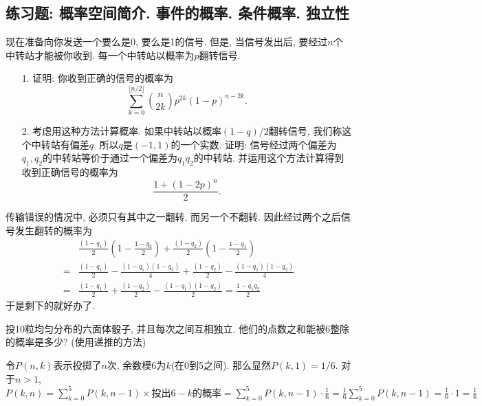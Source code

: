 \subsection*{练习题: 概率空间简介. 事件的概率. 条件概率. 独立性}

\begin{exercise}
   现在准备向你发送一个要么是0, 要么是1的信号. 但是, 当信号发出后, 要经过$n$个中转站才能被你收到. 每一个中转站以概率为$p$翻转信号. 
   \begin{itemize}
      \item [1.] 证明: 你收到正确的信号的概率为\[\sum_{k=0}^{\lfloor n/2\rfloor} \binom{n}{2k}p^{2k}(1-p)^{n-2k}.\]
      \item [2.] 考虑用这种方法计算概率. 如果中转站以概率$(1-q)/2$翻转信号, 我们称这个中转站有偏差$q$. 所以$q$是$(-1, 1)$的一个实数. 证明: 信号经过两个偏差为$q_1, q_2$的中转站等价于通过一个偏差为$q_1q_2$的中转站. 并运用这个方法计算得到收到正确信号的概率为\[\frac{1+(1-2p)^n}2.\]
   \end{itemize}
\end{exercise}

\begin{solution*}
   传输错误的情况中, 必须只有其中之一翻转, 而另一个不翻转. 因此经过两个之后信号发生翻转的概率为
   $$\begin{aligned} & \frac{\left(1-q_1\right)}{2}\left(1-\frac{1-q_2}{2}\right)+\frac{\left(1-q_2\right)}{2}\left(1-\frac{1-q_1}{2}\right) \\ = & \frac{\left(1-q_1\right)}{2}-\frac{\left(1-q_1\right)\left(1-q_2\right)}{4}+\frac{\left(1-q_2\right)}{2}-\frac{\left(1-q_1\right)\left(1-q_2\right)}{4} \\ = & \frac{\left(1-q_1\right)}{2}+\frac{\left(1-q_2\right)}{2}-\frac{\left(1-q_1\right)\left(1-q_2\right)}{2}=\frac{1-q_1 q_2}{2}\end{aligned}$$
   于是剩下的就好办了.
\end{solution*}

\begin{exercise}
   投10粒均匀分布的六面体骰子, 并且每次之间互相独立. 他们的点数之和能被6整除的概率是多少? (使用递推的方法)
\end{exercise}

\begin{solution*}
   令$P(n,k)$表示投掷了$n$次, 余数模6为$k$(在0到5之间). 那么显然$P(k,1)=1/6$. 对于$n>1$, $P(k, n)=\sum_{k=0}^5 P(k, n-1)\times\text{投出}6-k\text{的概率}=\sum_{k=0}^5 P(k, n-1) \cdot \frac{1}{6}=\frac{1}{6} \sum_{k=0}^5 P(k, n-1)=\frac{1}{6} \cdot 1=\frac{1}{6}$
\end{solution*}

